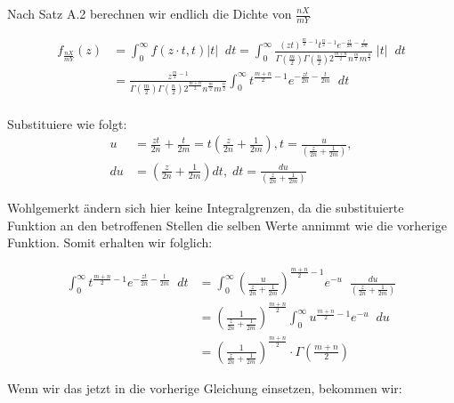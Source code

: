 \documentclass[a4paper]{article}
\begin{document}
Nach Satz A.2 berechnen wir endlich die Dichte von $\frac{nX}{mY}$

\begin{align*}
	f_{ \frac{nX}{mY} }(z) &= \int_{0}^{\infty} f(z \cdot t, t) | t | \;\; dt
	= \int_{0}^{\infty} 
			 \frac{ 
				\left( zt \right)  ^{\frac{ m }{ 2 } - 1} t ^{\frac{ n }{ 2 }-1} e ^ {-\frac{ zt }{ 2n } -\frac{ t }{ 2m }}
				}{  
				\Gamma(\frac{ m }{ 2 }) \Gamma(\frac{ n }{ 2 })
				2 ^{\frac{ m+n }{ 2 }} 
				n ^{\frac{ m }{ 2 }} m ^{\frac{ n }{ 2 }}
			} \; |t| \;\; dt \\
	&= \frac{ z ^{\frac{ m }{ 2 }-1} }{ 
		\Gamma(\frac{ m }{ 2 }) \Gamma(\frac{ n }{ 2 })
		2 ^{\frac{ m+n }{ 2 }} 
		n ^{\frac{ m }{ 2 }} m ^{\frac{ n }{ 2 }}
	}
	\int_{0}^{\infty} t ^{ \frac{m+n}{2} - 1} e ^{ - \frac{ zt }{ 2n } - \frac{ t }{ 2m } } \;\; dt \\
\end{align*}

Substituiere wie folgt:
\begin{align*}
	u &= \frac{ zt }{ 2n } + \frac{ t }{ 2m } = t\left( \frac{ z }{ 2n } + \frac{ 1 }{ 2m } \right) ,
	t = \frac{ u }{ \left( \frac{ z }{ 2n } + \frac{ 1 }{ 2m } \right)},\\
	du &=   \left(
		\frac{ z }{ 2n } + \frac{ 1 }{ 2m }
	\right)  dt, \;
	dt = \frac{ du }{ \left( \frac{ z }{ 2n } + \frac{ 1 }{ 2m } \right) }
\end{align*}

Wohlgemerkt ändern sich hier keine Integralgrenzen, da die substituierte Funktion an den
betroffenen Stellen die selben Werte annimmt wie die vorherige Funktion.
Somit erhalten wir folglich:

\begin{align*}
	\int_{0}^{\infty} t ^{ \frac{m+n}{2} - 1} e ^{ - \frac{ zt }{ 2n } - \frac{ t }{ 2m } } \;\; dt
	&= \int_{0}^{\infty} \left( 
		\frac{ u }{ 
			\frac{ z }{ 2n } + \frac{ 1 }{ 2m }
		}
		\right) ^{\frac{m+n}{2} -1} e ^{-u} \;\; \frac{ du }{ 
		\left(  
		\frac{ z }{ 2n } + \frac{ 1 }{ 2m }
		\right) 
	}\\
	&= \left( 
		\frac{ 1 }{ 
			\frac{ z }{ 2n } + \frac{ 1 }{ 2m }
		}
		\right) ^{
		\frac{ m+n }{2}
	}
	\int_{0}^{\infty}  u ^{ \frac{ m+n }{ 2 } -1} e^{ -u }\;\; du\\
	&= \left( 
		\frac{ 1 }{ 
			\frac{ z }{ 2n } + \frac{ 1 }{ 2m }
		}
		\right) ^{
		\frac{ m+n }{2}
	} \cdot \Gamma \left( 
	\frac{ m+n }{ 2 }
\right) 
\end{align*}

Wenn wir das jetzt in die vorherige Gleichung einsetzen, bekommen wir:
\end{document}
